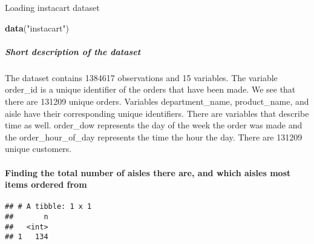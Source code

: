 \documentclass[]{article}
\newenvironment{Shaded}{\begin{snugshade}}{\end{snugshade}}
\newcommand{\KeywordTok}[1]{\textcolor[rgb]{0.13,0.29,0.53}{\textbf{#1}}}
\newcommand{\DataTypeTok}[1]{\textcolor[rgb]{0.13,0.29,0.53}{#1}}
\newcommand{\DecValTok}[1]{\textcolor[rgb]{0.00,0.00,0.81}{#1}}
\newcommand{\StringTok}[1]{\textcolor[rgb]{0.31,0.60,0.02}{#1}}
\newcommand{\OperatorTok}[1]{\textcolor[rgb]{0.81,0.36,0.00}{\textbf{#1}}}
\newcommand{\NormalTok}[1]{#1}
\let\oldparagraph\paragraph
\renewcommand{\paragraph}[1]{\oldparagraph{#1}\mbox{}}
\let\oldsubparagraph\subparagraph
\renewcommand{\subparagraph}[1]{\oldsubparagraph{#1}\mbox{}}
\begin{document}
Loading instacart dataset

\begin{Shaded}
\begin{Highlighting}[]
\KeywordTok{data}\NormalTok{(}\StringTok{"instacart"}\NormalTok{)}
\end{Highlighting}
\end{Shaded}

\subparagraph{Short description of the
dataset}\label{short-description-of-the-dataset}

The dataset contains 1384617 observations and 15 variables. The variable
order\_id is a unique identifier of the orders that have been made. We
see that there are 131209 unique orders. Variables department\_name,
product\_name, and aisle have their corresponding unique identifiers.
There are variables that describe time as well. order\_dow represents
the day of the week the order was made and the order\_hour\_of\_day
represents the time the hour the day. There are 131209 unique customers.

\paragraph{Finding the total number of aisles there are, and which
aisles most items ordered
from}\label{finding-the-total-number-of-aisles-there-are-and-which-aisles-most-items-ordered-from}

\begin{Shaded}
\end{Shaded}

\begin{verbatim}
## # A tibble: 1 x 1
##       n
##   <int>
## 1   134
\end{verbatim}

\begin{Shaded}
\end{Shaded}
\end{document}
